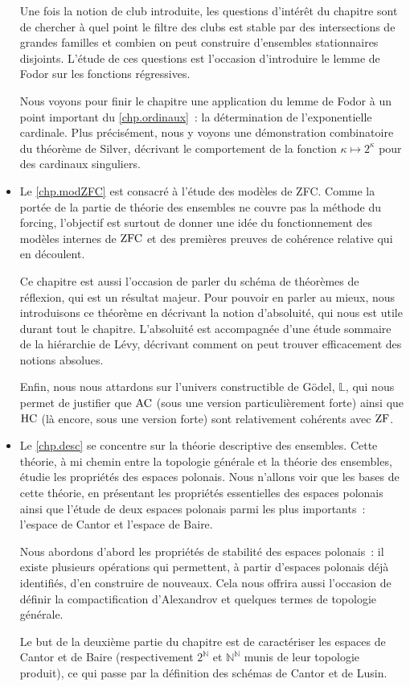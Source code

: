 \begin{itemize}
  Une fois la notion de club introduite, les questions d'intérêt du chapitre
  sont de chercher à quel point le filtre des clubs est stable par des
  intersections de grandes familles et combien on peut construire d'ensembles
  stationnaires disjoints. L'étude de ces questions est l'occasion d'introduire
  le lemme de Fodor sur les fonctions régressives.

  Nous voyons pour finir le chapitre une application du lemme de Fodor à un
  point important du \cref{chp.ordinaux}~: la détermination de l'exponentielle
  cardinale. Plus précisément, nous y voyons une démonstration combinatoire du
  théorème de Silver, décrivant le comportement de la fonction
  $\kappa\mapsto 2^\kappa$ pour des cardinaux singuliers.
\item Le \cref{chp.modZFC} est consacré à l'étude des modèles de ZFC. Comme la
  portée de la partie de théorie des ensembles ne couvre pas la méthode du
  forcing, l'objectif est surtout de donner une idée du fonctionnement des
  modèles internes de $\operatorname{ZFC}$ et des premières preuves de cohérence relative qui
  en découlent.

  Ce chapitre est aussi l'occasion de parler du schéma de théorèmes de
  réflexion, qui est un résultat majeur. Pour pouvoir en parler au mieux, nous
  introduisons ce théorème en décrivant la notion d'absoluité, qui nous est
  utile durant tout le chapitre. L'absoluité est accompagnée d'une étude
  sommaire de la hiérarchie de Lévy, décrivant comment on peut trouver
  efficacement des notions absolues.

  Enfin, nous nous attardons sur l'univers constructible de Gödel, $\mathbb L$,
  qui nous permet de justifier que $\operatorname{AC}$ (sous une version particulièrement
  forte) ainsi que $\operatorname{HC}$ (là encore, sous une version forte) sont relativement
  cohérents avec $\operatorname{ZF}$.
\item Le \cref{chp.desc} se concentre sur la théorie descriptive des ensembles.
  Cette théorie, à mi chemin entre la topologie générale et la théorie des
  ensembles, étudie les propriétés des espaces polonais. Nous n'allons voir que
  les bases de cette théorie, en présentant les propriétés essentielles des
  espaces polonais ainsi que l'étude de deux espaces polonais parmi les plus
  importants~: l'espace de Cantor et l'espace de Baire.

  Nous abordons d'abord les propriétés de stabilité des espaces polonais~: il
  existe plusieurs opérations qui permettent, à partir d'espaces polonais déjà
  identifiés, d'en construire de nouveaux. Cela nous offrira aussi l'occasion
  de définir la compactification d'Alexandrov et quelques termes de topologie
  générale.

  Le but de la deuxième partie du chapitre est de caractériser les espaces de
  Cantor et de Baire (respectivement $2^\mathbb N$ et $\mathbb N^\mathbb N$
  munis de leur topologie produit), ce qui passe par la définition des schémas
  de Cantor et de Lusin.
\end{itemize}

